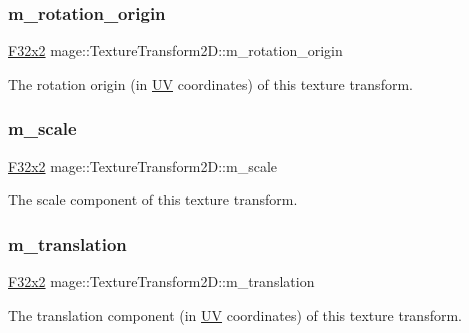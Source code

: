 \subsubsection{\texorpdfstring{m\+\_\+rotation\+\_\+origin}{m\_rotation\_origin}}
{\footnotesize\ttfamily \mbox{\hyperlink{namespacemage_aee4759dedc8def6c6dec26b5c7eddf29}{F32x2}} mage\+::\+Texture\+Transform2\+D\+::m\+\_\+rotation\+\_\+origin\hspace{0.3cm}{\ttfamily [private]}}

The rotation origin (in \mbox{\hyperlink{structmage_1_1_u_v}{UV}} coordinates) of this texture transform. \mbox{\label{classmage_1_1_texture_transform2_d_aa5e90db4dfa9012cd8c2d56f0d9c82c3}} 
\subsubsection{\texorpdfstring{m\+\_\+scale}{m\_scale}}
{\footnotesize\ttfamily \mbox{\hyperlink{namespacemage_aee4759dedc8def6c6dec26b5c7eddf29}{F32x2}} mage\+::\+Texture\+Transform2\+D\+::m\+\_\+scale\hspace{0.3cm}{\ttfamily [private]}}

The scale component of this texture transform. \mbox{\label{classmage_1_1_texture_transform2_d_a31dc714e85f735e4808718e81dca6932}} 
\subsubsection{\texorpdfstring{m\+\_\+translation}{m\_translation}}
{\footnotesize\ttfamily \mbox{\hyperlink{namespacemage_aee4759dedc8def6c6dec26b5c7eddf29}{F32x2}} mage\+::\+Texture\+Transform2\+D\+::m\+\_\+translation\hspace{0.3cm}{\ttfamily [private]}}

The translation component (in \mbox{\hyperlink{structmage_1_1_u_v}{UV}} coordinates) of this texture transform. 